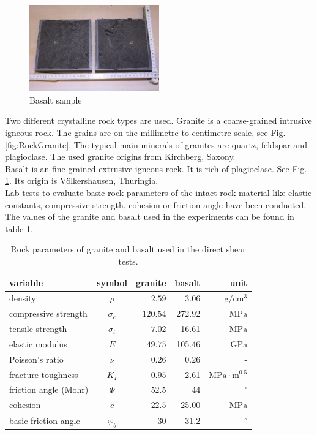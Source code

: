 \begin{figure}[!ht]
\begin{center}
\includegraphics[width=0.5\textwidth]{./figures/ExpRockBasalt.jpg}
\end{center}
\caption{Basalt sample}
\label{fig:RockBasalt}
\end{figure}

Two different crystalline rock  types are used. Granite is a coarse-grained intrusive igneous rock. The grains are on the millimetre to centimetre scale, see Fig. \ref{fig:RockGranite}. The typical main minerals of granites are quartz, feldspar and plagioclase. The used granite origins from Kirchberg, Saxony.\\
Basalt is an fine-grained extrusive igneous rock. It is rich of plagioclase. See Fig. \ref{fig:RockBasalt}. Its origin is V\"olkershausen, Thuringia.\\
Lab tests to evaluate basic rock parameters of the intact rock material like elastic constants, compressive strength, cohesion or friction angle have been conducted. The values of the granite and basalt used in the experiments can be found in table \ref{table:MEX7_rockParam}.\\
\begin{table}[!ht]
\begin{center}
\begin{tabular}{l c r r r}
variable & symbol & granite & basalt & unit\\
\hline
density & $\rho$ & $2.59$ &3.06 &$\text{g}/\text{cm}^3$\\
compressive strength & $\sigma_c$ & $120.54$&272.92 &$\text{MPa}   $\\
tensile strength & $\sigma_t$ & $7.02$&16.61 &$ \text{MPa}   $\\
elastic modulus & $E$ & $49.75$&105.46 &$ \text{GPa}   $\\
Poisson's ratio & $\nu$ & 0.26 & 0.26  & -\\
fracture toughness & $K_I$ & $0.95$& 2.61 &$\text{MPa}\cdot\text{m}^{0.5}$\\
friction angle (Mohr) & $\Phi$ &  $52.5$& 44 &$^\circ$\\
cohesion & $c$ &  $22.5$& 25.00  &$ \text{MPa}   $\\
basic friction angle &$\varphi_b$ &30 & 31.2 & $^\circ$\\
\end{tabular}
\caption{Rock parameters of granite and basalt used in the direct shear tests.}
\label{table:MEX7_rockParam}
\end{center}
\end{table}